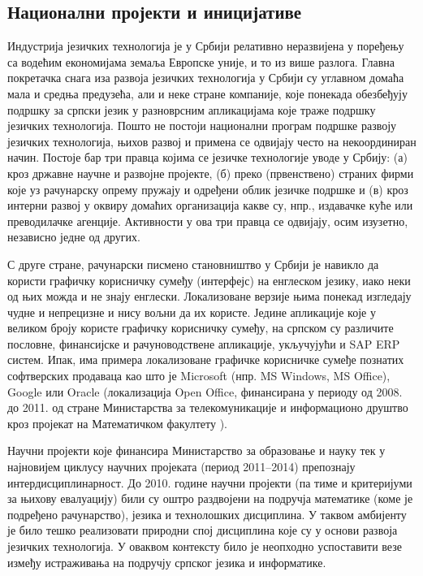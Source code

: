 \begin{multicols}{2}
 \subsection {Национални пројекти и иницијативе}
   
Индустрија језичких технологија је у Србији релативно неразвијена у поређењу са водећим економијама земаља Европске уније, и то из више разлога. Главна покретачка снага иза развоја језичких технологија у Србији су углавном домаћа мала и средња предузећа, али и неке стране компаније, које понекада обезбеђују подршку за српски језик у разноврсним апликацијама које траже подршку језичких технологија. Пошто не постоји национални програм подршке развоју језичких технологија, њихов развој и примена се одвијају често на некоординиран начин. Постоје бар три правца којима се језичке технологије уводе у Србију: (а) кроз државне научне и развојне пројекте, (б) преко (првенствено) страних фирми које уз рачунарску опрему пружају и одређени облик језичке подршке и (в) кроз интерни развој у оквиру домаћих организација какве су, нпр., издавачке куће или преводилачке агенције. Активности у ова три правца се одвијају, осим изузетно, независно једне од других. 

С друге стране, рачунарски писмено становништво у Србији је навикло да користи графичку корисничку сумеђу (интерфејс) на енглеском језику, иако неки од њих можда и не знају енглески. Локализоване верзије њима понекад изгледају чудне и непрецизне и нису вољни да их користе. Једине апликације које у великом броју користе  графичку корисничку сумеђу, на српском су различите пословне, финансијске и рачуноводствене апликације, укључујући и SAP ERP систем. Ипак, има примера локализоване графичке корисничке сумеђе познатих софтверских продаваца као што је Microsoft (нпр. MS Windows, MS Office), Google или Oracle (локализација Open Office, финансирана у периоду од 2008. до 2011. од стране Министарства за телекомуникације и информационо друштво кроз пројекат на Математичком факултету \cite{OO_MATF}).

Научни пројекти које финансира Министарство за образовање и науку тек у најновијем циклусу научних пројеката (период 2011--2014) препознају интердисциплинарност. До 2010. године научни пројекти (па тиме и критеријуми за њихову евалуацију) били су оштро раздвојени на подручја математике (коме је подређено рачунарство), језика и технолошких дисциплина. У таквом амбијенту је било тешко реализовати природни спој дисциплина које су у основи развоја језичких технологија. У оваквом контексту било је неопходно успоставити везе између истраживања на подручју српског језика и информатике. 


\end{multicols}
